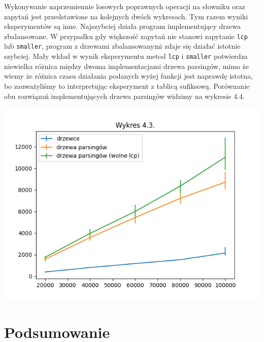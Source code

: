 \documentclass[declaration,shortabstract]{iithesis}
\theoremstyle{definition} \newtheorem{definition}{Definicja}[chapter]
\theoremstyle{remark} \newtheorem{remark}[definition]{Obserwacja}
\theoremstyle{plain} \newtheorem{theorem}[definition]{Twierdzenie}
\theoremstyle{remark} \newtheorem{example}{Przykład}[definition]
\theoremstyle{plain} \newtheorem{lemma}[definition]{Lemat}
\begin{document}
Wykonywanie naprzemiennie losowych poprawnych operacji na słowniku oraz zapytań jest przedstawione na kolejnych dwóch wykresach. Tym razem wyniki eksperymentów są inne. Najszybciej działa program implementujący drzewa zbalansowane. W przypadku gdy większość zapytań nie stanowi zapytanie \texttt{lcp} lub \texttt{smaller}, program z drzewami zbalansowanymi zdaje się działać istotnie szybciej. Mały wkład w wynik eksperymentu metod \texttt{lcp} i \texttt{smaller} potwierdza niewielka różnica między dwoma implementacjami drzewa parsingów, mimo że wiemy że różnica czasu działania podanych wyżej funkcji jest naprawdę istotna, bo zauważyliśmy to interpretując eksperyment z tablicą sufiksową. Porównanie obu rozwiązań implementujących drzewa parsingów widzimy na wykresie 4.4.

\begin{center}
    \includegraphics[width=\textwidth]{losowy1.png}
\end{center}

\section{Podsumowanie}
\end{document}
